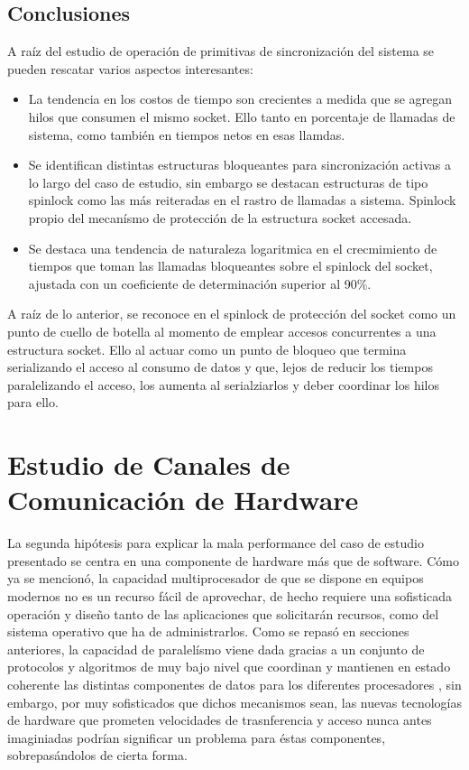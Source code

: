 \subsection{Conclusiones}
A raíz del estudio de operación de primitivas de sincronización del sistema se pueden rescatar varios aspectos interesantes:
\begin{itemize}
\item La tendencia en los costos de tiempo son crecientes a medida que se agregan hilos que consumen el mismo socket. Ello tanto en porcentaje de llamadas de sistema, como también en tiempos netos en esas llamdas.
\item Se identifican distintas estructuras bloqueantes para sincronización activas a lo largo del caso de estudio, sin embargo se destacan estructuras de tipo spinlock como las más reiteradas en el rastro de llamadas a sistema. Spinlock propio del mecanísmo de protección de la estructura socket accesada.
\item Se destaca una tendencia de naturaleza logaritmica en el crecmimiento de tiempos que toman las llamadas bloqueantes sobre el spinlock del socket, ajustada con un coeficiente de determinación superior al 90\%.
\end{itemize}
A raíz de lo anterior, se reconoce en el spinlock de protección del socket como un punto de cuello de botella al momento de emplear accesos concurrentes a una estructura socket. Ello al actuar como un punto de bloqueo que termina serializando el acceso al consumo de datos y que, lejos de reducir los tiempos paralelizando el acceso, los aumenta al serialziarlos y deber coordinar los hilos para ello.

\section{Estudio de Canales de Comunicación de Hardware}
La segunda hipótesis para explicar la mala performance del caso de estudio presentado se centra en una componente de hardware más que de software. Cómo ya se mencionó, la capacidad multiprocesador de que se dispone en equipos modernos no es un recurso fácil de aprovechar, de hecho requiere una sofisticada operación y diseño tanto de las aplicaciones que solicitarán recursos, como del sistema operativo que ha de administrarlos. Como se repasó en secciones anteriores, la capacidad de paralelísmo viene dada gracias a un conjunto de protocolos y algoritmos de muy bajo nivel que coordinan y mantienen en estado coherente las distintas componentes de datos para los diferentes procesadores \cite{paper:MESI, paper:snoop}, sin embargo, por muy sofisticados que dichos mecanismos sean, las nuevas tecnologías de hardware que prometen velocidades de trasnferencia y acceso nunca antes imaginiadas podrían significar un problema para éstas componentes, sobrepasándolos de cierta forma.

